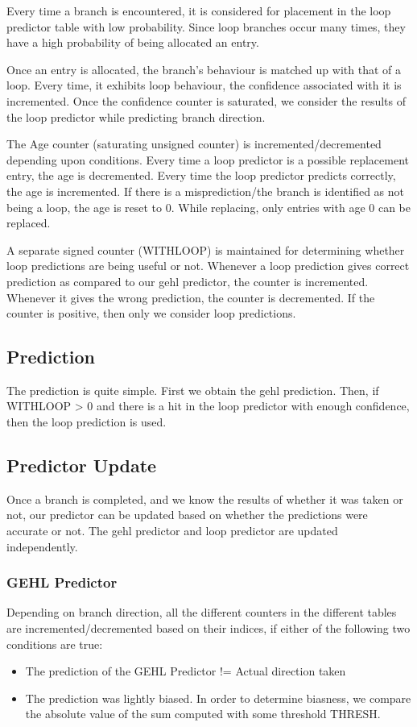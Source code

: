 \documentclass{sig-alternate}
\begin{document}
Every time a branch is encountered, it is considered for placement in the loop
predictor table with low probability. Since loop branches occur many times, they
have a high probability of being allocated an entry.

Once an entry is allocated, the branch's behaviour is matched up with that of a
loop. Every time, it exhibits loop behaviour, the confidence associated with it
is incremented. Once the confidence counter is saturated, we consider the
results of the loop predictor while predicting branch direction.

The Age counter (saturating unsigned counter) is incremented/decremented
depending upon conditions. Every time a loop predictor is a possible replacement
entry, the age is decremented. Every time the loop predictor predicts correctly,
the age is incremented. If there is a misprediction/the branch is identified as
not being a loop, the age is reset to 0. While replacing, only entries with age
0 can be replaced.

A separate signed counter (WITHLOOP) is maintained for determining whether loop
predictions are being useful or not. Whenever a loop prediction gives correct
prediction as compared to our gehl predictor, the counter is incremented.
Whenever it gives the wrong prediction, the counter is decremented. If the
counter is positive, then only we consider loop predictions.

\subsection{Prediction}

The prediction is quite simple. First we obtain the gehl prediction. Then,
if WITHLOOP > 0 and there is a hit in the loop predictor with enough confidence,
then the loop prediction is used.

\subsection{Predictor Update}

Once a branch is completed, and we know the results of whether it was taken or
not, our predictor can be updated based on whether the predictions were accurate
or not. The gehl predictor and loop predictor are updated independently.
\subsubsection{GEHL Predictor}
Depending on branch direction, all the different counters in the different tables are
incremented/decremented based on their indices, if either of the following two
conditions are true:
\begin{itemize}
  \item The prediction of the GEHL Predictor != Actual direction taken
  \item The prediction was lightly biased. In order to determine biasness, we
    compare the absolute value of the sum computed with some threshold THRESH.
\end{itemize}
  
\end{document}
